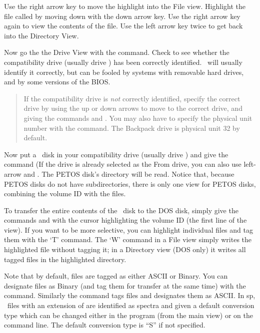 Use the right arrow key to move the highlight into the File view. 
Highlight the file called  by moving down with the 
down arrow key.  Use the right arrow key again to view the contents
of the file.  Use the left arrow key twice to get back
into the Directory View.

Now go the the Drive View with the  command.  Check to
see whether the compatibility drive (usually drive ) has
been correctly identified.  \RD\ will usually identify it correctly,
but can be fooled by systems with removable hard drives, and by some
versions of the BIOS.

\begin{quote}
  If the compatibility drive is {\em not} correctly identified,
  specify the correct drive by using the up or down arrows to move to
  the correct drive, and giving the commands  and
  .  You may
  also have to specify the physical unit number with the
   command.  The Backpack drive is physical
  unit 32 by default.
\end{quote}

Now put a \OS\ disk in your compatibility drive (usually drive
) and give the command	  (If the drive is
already selected as the From drive, you can also use
left-arrow and .  The PETOS disk's directory will be
read.  Notice that, because PETOS disks do not have subdirectories,
there is only one view for PETOS disks, combining the volume ID with
the files.


To transfer the entire contents of the \OS\ disk to the DOS disk,
simply give the commands  and  with the
cursor highlighting the volume ID (the first line of the view).  If
you want to be more selective, you can highlight individual files and
tag them with the `T' command.  The `W' command in a File view
simply writes the highlighted file without tagging it; in a
Directory view (DOS only) it writes all tagged files in the highlighted
directory.

Note that by default, files are tagged as either ASCII or Binary.  
You can designate files as Binary (and tag them for transfer at the
same time) with the  command.  Similarly the
 command tags files and designates them as ASCII. 
In \RD sp, \OS\ files with an extension of  are identified
as spectra and given a default conversion type which can be changed
either in the program (from the main view) or on the command line.
The default conversion type is ``S'' if not specified.
 


